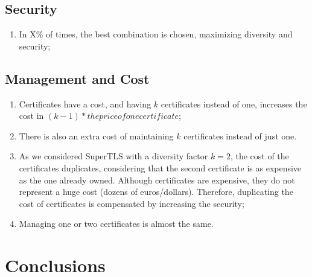\documentclass{sig-alternate-05-2015}
\begin{document}
\subsection{Security}

\begin{enumerate}
\item{In X\% of times, the best combination is chosen, maximizing diversity and security;}
\end{enumerate}

\subsection{Management and Cost}

\begin{enumerate}
\item{Certificates have a cost, and having $k$ certificates instead of one, increases the cost in $(k - 1) * the price of one certificate$;}
\item{There is also an extra cost of maintaining $k$ certificates instead of just one.}
\item{As we considered SuperTLS with a diversity factor $k = 2$, the cost of the certificates duplicates, considering that the second certificate is as expensive as the one already owned. Although certificates are expensive, they do not represent a huge cost (dozens of euros/dollars). Therefore, duplicating the cost of certificates is compensated by increasing the security;}
\item{Managing one or two certificates is almost the same.}
\end{enumerate}

\section{Conclusions}


\end{document}
